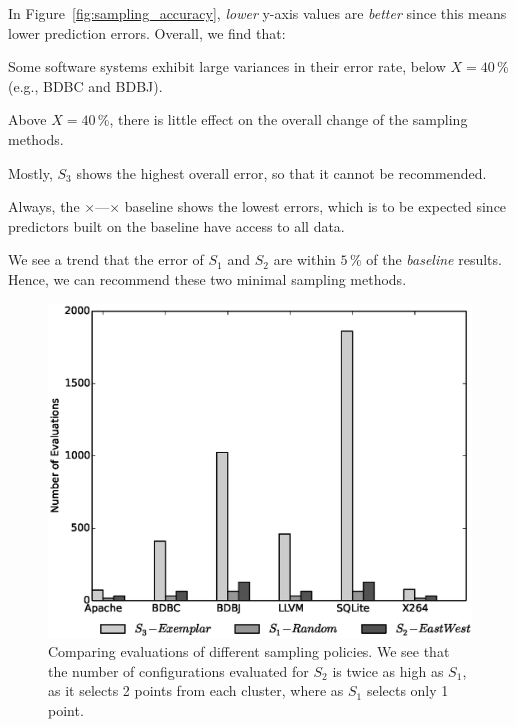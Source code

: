 \documentclass{newsig}
\newcommand{\fig}[1]{Figure~\ref{fig:#1}}
\begin{document}
In \fig{sampling_accuracy}, {\em lower} y-axis values  are {\em better} since this means lower
prediction errors. Overall, we find that:
\begin{compactitem}

\item Some software systems exhibit large variances in their error rate, below $X=40$\,\% (e.g., BDBC and BDBJ).
\item Above $X=40$\,\%, there is little effect on the overall change of the sampling methods.
\item
Mostly, $S_3$ shows the highest overall error, 
so that it cannot be recommended.
\item Always, the   $\times$\hspace{-2pt}---\hspace{-2pt}$\times$ baseline shows the lowest errors, which is to be
expected since predictors built on the baseline have access to all data.
\item
We see a trend that the error of  $S_1$ and $S_2$ are within $5$\,\% of the {\em baseline} results.
Hence, we can recommend these two minimal sampling methods.
\end{compactitem}

\begin{figure}[tbh]
\centering
\includegraphics[width=0.9\columnwidth]{Figures/evaluation_graph}
\caption{Comparing evaluations of different sampling policies. We see that the number of configurations evaluated for $S_2$ is twice as high as $S_1$, as it selects 2 points from each cluster, where as  $S_1$ selects only 1 point. }\label{fig:Evaluations}
\end{figure}
\end{document}
